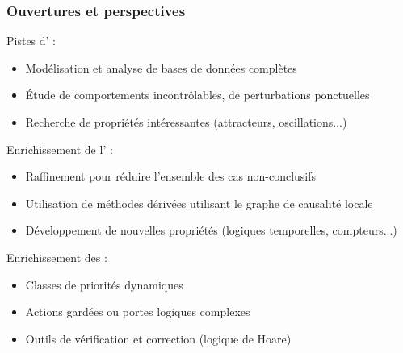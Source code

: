 \begin{frame}[c]
  \frametitle{Ouvertures et perspectives}

Pistes d' :
\begin{itemize}
  \item Modélisation et analyse de bases de données complètes
  \item Étude de comportements incontrôlables, de perturbations ponctuelles
  \item Recherche de propriétés intéressantes (attracteurs, oscillations...)
\end{itemize}

\medskip
Enrichissement de l' :
\begin{itemize}
  \item Raffinement pour réduire l'ensemble des cas non-conclusifs
  \item Utilisation de méthodes dérivées utilisant le graphe de causalité locale
  \item Développement de nouvelles propriétés (logiques temporelles, compteurs...)
\end{itemize}

\medskip
Enrichissement des  :
\begin{itemize}
  \item Classes de priorités dynamiques
  \item Actions gardées ou portes logiques complexes
  \item Outils de vérification et correction (logique de Hoare)
\end{itemize}

\end{frame}



